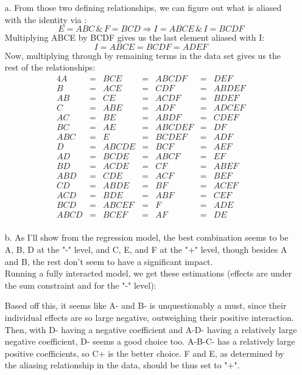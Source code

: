 \documentclass[11pt]{article}
\theoremstyle{definition}
\begin{document}
\begin{itemize}
    \item[a.]
        From those two defining relationships, we can figure out what is aliased with the identity via :
        \[E=ABC \, \& \, F=BCD \Longrightarrow I=ABCE \, \& \, I = BCDF\]
        Multiplying ABCE by BCDF gives us the last element aliased with I:
        \[I = ABCE = BCDF = ADEF\]
        Now, multiplying through by remaining terms in the data set gives us the rest of the relationships:
        \begin{alignat*}{4}
            A    &=& BCE   &=& ABCDF  &=& DEF \\
            B    &=& ACE   &=& CDF    &=& ABDEF \\
            AB   &=& CE    &=& ACDF   &=& BDEF \\
            C    &=& ABE   &=& ADF    &=& ADCEF \\
            AC   &=& BE    &=& ABDF   &=& CDEF \\
            BC   &=& AE    &=& ABCDEF &=& DF \\
            ABC  &=& E     &=& BCDEF  &=& ADF \\
            D    &=& ABCDE &=& BCF    &=& AEF \\
            AD   &=& BCDE  &=& ABCF   &=& EF \\
            BD   &=& ACDE  &=& CF     &=& ABEF \\
            ABD  &=& CDE   &=& ACF    &=& BEF \\
            CD   &=& ABDE  &=& BF     &=& ACEF \\
            ACD  &=& BDE   &=& ABF    &=& CEF \\
            BCD  &=& ABCEF &=& F      &=& ADE \\
            ABCD &=& BCEF  &=& AF     &=& DE \\
        \end{alignat*}
    \item[b.]
        As I'll show from the regression model, the best combination seems to be A, B, D at the "-" level, and C, E, and F at the "+" level, though besides A and B, the rest don't seem to have a significant impact. \\
        \indent Running a fully interacted model, we get these estimations (effects are under the sum constraint and for the "-" level):
        \FloatBarrier
         
        \FloatBarrier
        Based off this, it seems like A- and B- is unquestionably a must, since their individual effects are so large negative, outweighing their positive interaction. Then, with D- having a negative coefficient and A-D- having a relatively large negative coefficient, D- seems a good choice too. A-B-C- has a relatively large positive coefficients, so C+ is the better choice. F and E, as determined by the aliasing relationship in the data, should be thus set to "+". \\

\end{itemize}
\end{document}
